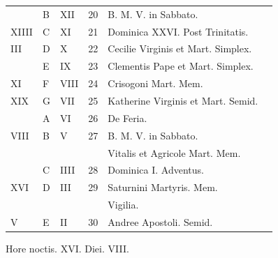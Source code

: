 \begin{center}
\begin{tabular}{l | l | l | r | l l}
\color{Red}  & B & \color{Red} XII & 20 & B. M. V. in Sabbato. & \color{Red} \\
\color{Red} XIIII & C & \color{Red} XI & 21 & Dominica XXVI. Post Trinitatis. & \color{Red} \\
\color{Red} III & D & \color{Red} X & 22 & \color{Red} Cecilie Virginis et Mart. Simplex. & \color{Red} \\
\color{Red}  & E & \color{Red} IX & 23 & Clementis Pape et Mart. Simplex. & \color{Red} \\
\color{Red} XI & F & \color{Red} VIII & 24 & Crisogoni Mart. Mem. & \color{Red} \\
\color{Red} XIX & G & \color{Red} VII & 25 & \color{Red} Katherine Virginis et Mart. Semid. \\
\color{Red}  & \color{Red} A & \color{Red} VI & 26 & De Feria. & \color{Red} \\
\color{Red} VIII & B & \color{Red} V & 27 & B. M. V. in Sabbato. \\
& & & & \quad Vitalis et Agricole Mart. Mem. & \color{Red} \\
\color{Red}  & C & \color{Red} IIII & 28 & \color{Red} Dominica I. Adventus. & \color{Red} \\
\color{Red} XVI & D & \color{Red} III & 29 & \color{Red} Saturnini Martyris. Mem. & \\
& & & & \qquad \color{Red} Vigilia. \\
\color{Red} V & E & \color{Red} II & 30 & Andree Apostoli. Semid. & \color{Red} \\
\end{tabular}
\newline \color{Red} Hore noctis. XVI. Diei. VIII.
\end{center}



\newpage
\color{Red}\color{black}

